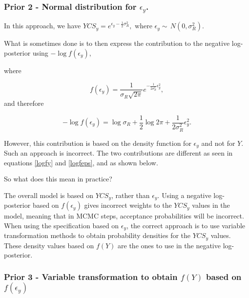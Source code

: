 \begin{appendices}
\subsubsection*{\texorpdfstring{Prior 2 - Normal distribution for
		\(\epsilon_y\).}{2.2.1 Prior 2 - Normal distribution for \textbackslash{}epsilon\_y.}}\label{prior-2---normal-distribution-for-epsilon_y.}

In this approach, we have
\(YCS_y = e^{\epsilon_y - \frac{1}{2}\sigma^2_R},\,\, \text{where } \epsilon_y \sim \,N(0, \sigma^2_R)\).

What is sometimes done is to then express the contribution to the
negative log-posterior using \(-\log f(\epsilon_y)\),

where

\[f(\epsilon_y) = \frac{1}{\sigma_R\sqrt{2\pi}}e^{-\frac{1}{2\sigma_R^2}\epsilon_y^2},\]
and therefore

\begin{equation}
-\log f(\epsilon_y)= \log \sigma_R + \frac{1}{2}\log 2\pi + \frac{1}{2\sigma_R^2}\epsilon_y^2.
\label{logfeps}
\end{equation}

However, this contribution is based on the density function for
\(\epsilon_y\) and not for \(Y\). Such an approach is incorrect. The two
contributions are different as seen in equations \ref{logfy} and
\ref{logfeps}, and as shown below.

So what does this mean in practice?

The overall model is based on \(YCS_y\), rather than \(\epsilon_y\).
Using a negative log-posterior based on \(f(\epsilon_y)\) gives
incorrect weights to the \(YCS_y\) values in the model, meaning that in
MCMC steps, acceptance probabilities will be incorrect. When using the
specification based on \(\epsilon_y\), the correct approach is to use
variable transformation methods to obtain probability densities for the
\(YCS_y\) values. These density values based on \(f(Y)\) are the ones to
use in the negative log-posterior.

\subsubsection*{\texorpdfstring{Prior 3 - Variable transformation
		to obtain \(f(Y)\) based on
		\(f(\epsilon_y)\)}{Prior 3 - Variable transformation to obtain f(Y) based on f(\textbackslash{}epsilon\_y)}}\label{prior-3---variable-transformation-to-obtain-fy-based-on-fepsilon_y}


\end{appendices}
